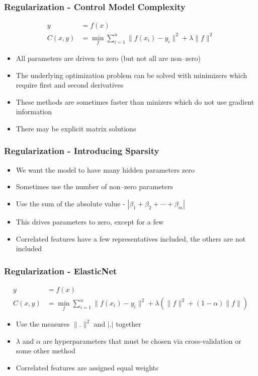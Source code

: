 \documentclass{beamer}
\begin{document}
\begin{frame}
\frametitle{Regularization - Control Model Complexity}
\begin{align}
y &= f(x) \\
C(x, y) &= \min_f \sum_{i=1}^{n} \| f(x_i) - y_i \|^2 + \lambda \| f \|^2
\end{align}
\begin{itemize}
\item All parameters are driven to zero (but not all are non--zero)
\item The underlying optimization problem can be solved with minimizers which require first and second derivatives
\item These methods are sometimes faster than minizers which do not use gradient information
\item There may be explicit matrix solutions
\end{itemize}
\end{frame}

\begin{frame}
\frametitle{Regularization - Introducing Sparsity}
\begin{itemize}
\item We want the model to have many hidden parameters zero
\item Sometimes use the number of non--zero parameters
\item Use the sum of the absolute value - $| \beta_1 + \beta_2 + \cdots + \beta_m |$
\item This drives parameters to zero, except for a few
\item Correlated features have a few representatives included, the others are not included
\end{itemize}
\end{frame}

\begin{frame}
\frametitle{Regularization - ElasticNet}
\begin{align}
y &= f(x) \\
C(x, y) &= \min_f \sum_{i=1}^{n} \| f(x_i) - y_i \|^2 + \lambda \left( \| f \|^2 + (1 - \alpha) \| f \| \right)
\end{align}
\begin{itemize}
\item Use the measures $\|. \|^2$ and $|.|$ together
\item $\lambda$ and $\alpha$ are hyperparameters that must be chosen via cross-validation or some other method
\item Correlated features are assigned equal weights
\end{itemize}
\end{frame}
\end{document}
